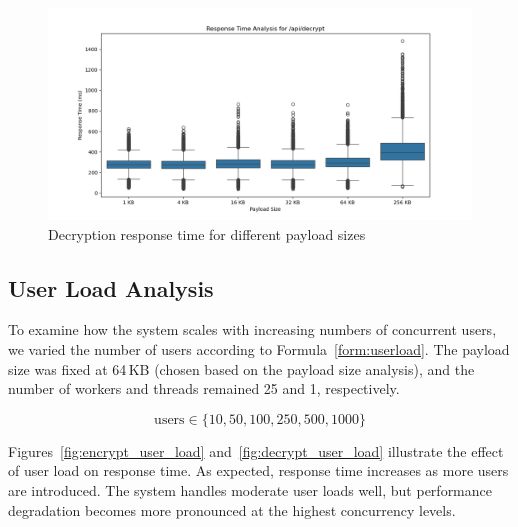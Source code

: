 \documentclass[cic,tc,english]{iiufrgs}
\begin{document}
            \begin{figure}
                \centering
                \includegraphics[width=\textwidth]{images/phase2/response_time_api_decrypt.png}
                \caption{Decryption response time for different payload sizes}
                \label{fig:decrypt_payload_size}
            \end{figure}

            \subsection{User Load Analysis}
            \label{subsec:user_load_analysis}

            To examine how the system scales with increasing numbers of concurrent users, we varied the number of users according to Formula~\ref{form:userload}. The payload size was fixed at 64\,KB (chosen based on the payload size analysis), and the number of workers and threads remained 25 and 1, respectively.

            \begin{equation}
            \label{form:userload}
                \text{users} \in \{10, 50, 100, 250, 500, 1000\}
            \end{equation}

            Figures~\ref{fig:encrypt_user_load} and~\ref{fig:decrypt_user_load} illustrate the effect of user load on response time. As expected, response time increases as more users are introduced. The system handles moderate user loads well, but performance degradation becomes more pronounced at the highest concurrency levels.
\end{document}
